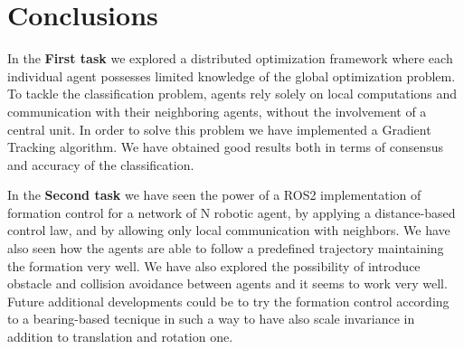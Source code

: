 \documentclass[a4paper,11pt,oneside]{book}
\begin{document}
\chapter*{Conclusions}
In the \textbf{First task} we explored a distributed optimization framework where each individual agent possesses limited knowledge of the global optimization problem. To tackle the classification problem, agents rely solely on local computations and communication with their neighboring agents, without the involvement of a central unit. In order to solve this problem we have implemented a Gradient Tracking algorithm. 
We have obtained good results both in terms of consensus and accuracy of the classification. 

\bigskip
In the \textbf{Second task} we have seen the power of a ROS2 implementation of formation control for a network of N robotic agent, by applying a distance-based control law, and by allowing only local communication with neighbors. We have also seen how the agents are able to follow a predefined trajectory maintaining the formation very well.
We have also explored the possibility of introduce obstacle and collision avoidance between agents and it seems to work very well. Future additional developments could be to try the formation control according to a bearing-based tecnique in such a way to have also scale invariance in addition to translation and rotation one.


%


\end{document}
